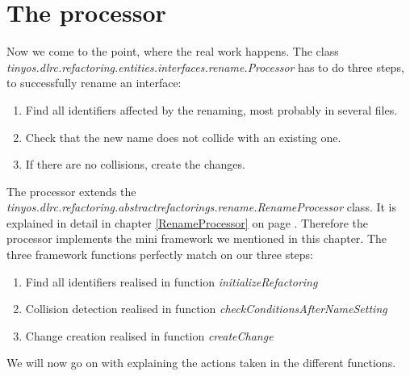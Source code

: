 \documentclass[a4paper,10pt]{report}
\begin{document}
\section{The processor}
Now we come to the point, where the real work happens.
The class {\it tinyos.dlrc.refactoring.entities.interfaces.rename.Processor} has to do three steps, to successfully rename an interface:
   \begin{enumerate}
    \item Find all identifiers affected by the renaming, most probably in several files.
    \item Check that the new name does not collide with an existing one.
    \item If there are no collisions, create the changes.
   \end{enumerate}
The processor extends the {\it tinyos.dlrc.refactoring.abstractrefactorings.rename.RenameProcessor} class.
It is explained in detail in chapter \ref{RenameProcessor} on page \pageref{RenameProcessor}.
Therefore the processor implements the mini framework we mentioned in this chapter.
The three framework functions perfectly match on our three steps:
   \begin{enumerate}
     \item Find all identifiers realised in function {\it initializeRefactoring}
     \item Collision detection realised in function {\it checkConditionsAfterNameSetting}
     \item Change creation realised in function {\it createChange}
   \end{enumerate}
We will now go on with explaining the actions taken in the different functions.
\end{document}

